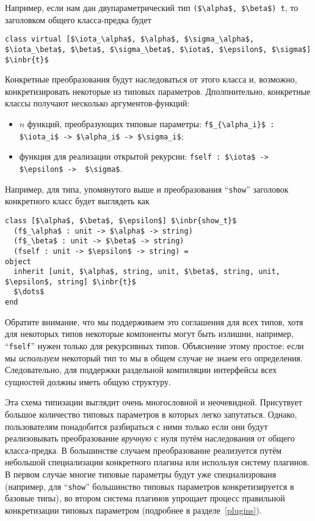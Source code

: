Например, если нам дан двупараметрический тип \lstinline{($\alpha$, $\beta$) t}, то заголовком общего класса-предка будет 

\begin{lstlisting}
class virtual [$\iota_\alpha$, $\alpha$, $\sigma_\alpha$, $\iota_\beta$, $\beta$, $\sigma_\beta$, $\iota$, $\epsilon$, $\sigma$] $\inbr{t}$
\end{lstlisting}

Конкретные преобразования будут наследоваться от этого класса и, возможно, конкретизировать некоторые из типовых параметров.
Дполпнительно, конкретные классы получают несколько аргументов-функций:

\begin{itemize}
\item $n$ функций, преобразующих типовые параметры: \lstinline|f$_{\alpha_i}$ : $\iota_i$ -> $\alpha_i$ -> $\sigma_i$|;
\item функция для реализации открытой рекурсии: \lstinline|fself : $\iota$ -> $\epsilon$ ->  $\sigma$|.
\end{itemize}

Например, для типа, упомянутого выше и преобразования ``\lstinline{show}'' заголовок конкретного класс будет выглядеть как

\begin{lstlisting}
class [$\alpha$, $\beta$, $\epsilon$] $\inbr{show_t}$ 
  (f$_\alpha$ : unit -> $\alpha$ -> string)
  (f$_\beta$ : unit -> $\beta$ -> string)
  (fself : unit -> $\epsilon$ -> string) =
object 
  inherit [unit, $\alpha$, string, unit, $\beta$, string, unit, $\epsilon$, string] $\inbr{t}$
  $\dots$
end 
\end{lstlisting}

Обратите внимание, что мы поддерживаем это соглашения для всех типов, хотя для некоторых типов некоторые компоненты могут быть излишни, например, ``\lstinline{fself}''
нужен только для рекурсивных типов. Объяснение этому простое: если мы \emph{используем} некоторый тип
то мы в общем случае не знаем его определения. Следовательно, для поддержки раздельной компиляции интерфейсы всех сущностей должны иметь общую структуру.

Эта схема типизации выглядит очень многословной и неочевидной. Присутвует большое количество типовых параметров в которых легко запутаться.
Однако, пользователям понадобится разбираться с ними только если они будут реализовывать преобразование \emph{вручную} с нуля путём 
наследования от общего класса-предка.
В большинстве случаем преобразование реализуется путём небольшой специализации конкретного плагина или используя систему плагинов. 
В первом случае многие типовые параметры будут уже специализрованя (например, для  ``\lstinline{show}'' большинство типовых параметров конкретизируется в базовые типы), во втором система плагинов упрощает процесс правильной конкретизации типовых параметром (подробнее в 
разделе~\ref{plugins}).

